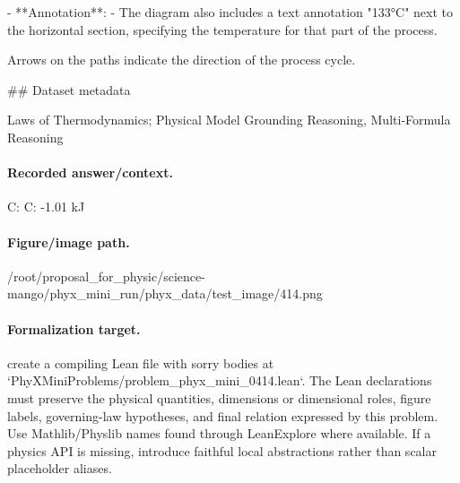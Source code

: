 - **Annotation**:
  - The diagram also includes a text annotation "133°C" next to the horizontal section, specifying the temperature for that part of the process. 

Arrows on the paths indicate the direction of the process cycle.

\#\# Dataset metadata

Laws of Thermodynamics; Physical Model Grounding Reasoning, Multi-Formula Reasoning

\paragraph{Recorded answer/context.}
C: C: -1.01 kJ

\paragraph{Figure/image path.}
/root/proposal\_for\_physic/science-mango/phyx\_mini\_run/phyx\_data/test\_image/414.png

\paragraph{Formalization target.}
create a compiling Lean file with sorry bodies at `PhyXMiniProblems/problem\_phyx\_mini\_0414.lean`. The Lean declarations must preserve the physical quantities, dimensions or dimensional roles, figure labels, governing-law hypotheses, and final relation expressed by this problem.
Use Mathlib/Physlib names found through LeanExplore where available. If a physics API is missing, introduce faithful local abstractions rather than scalar placeholder aliases.

